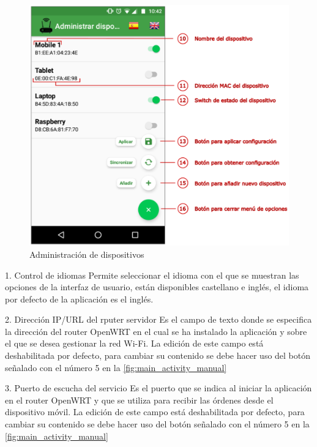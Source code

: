 \documentclass{article}
\begin{document}
    \begin{figure}[h!]
        \centering
            \includegraphics[scale=0.5]{devices_activity_manual.eps}
            \caption*{Administración de dispositivos}
            \label{fig:devices_activity_manual}
    \end{figure}


    1. Control de idiomas
    Permite seleccionar el idioma con el que se muestran las opciones de la interfaz de usuario, están disponibles castellano e inglés, el idioma por defecto de la aplicación es el inglés.

    2. Dirección IP/URL del rputer servidor
    Es el campo de texto donde se especifica la dirección del router OpenWRT en el cual se ha instalado la aplicación y sobre el que se desea gestionar la red Wi-Fi. La edición de este campo está deshabilitada por defecto, para cambiar su contenido se debe hacer uso del botón señalado con el número 5 en la \ref{fig:main_activity_manual}

    3. Puerto de escucha del servicio
    Es el puerto que se indica al iniciar la aplicación en el router OpenWRT y que se utiliza para recibir las órdenes desde el dispositivo móvil. La edición de este campo está deshabilitada por defecto, para cambiar su contenido se debe hacer uso del botón señalado con el número 5 en la \ref{fig:main_activity_manual}
\end{document}
